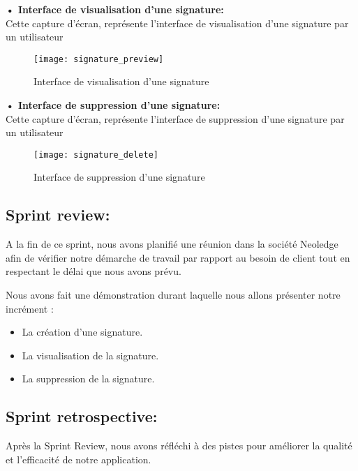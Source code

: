 \textbf{•	Interface de visualisation d'une signature:}\\
Cette capture d'écran, représente l'interface de visualisation d'une signature par un utilisateur

\newpage

\begin{figure}[h]
  \centering
  \texttt{[image: signature\_preview]}
  \caption{Interface de visualisation d'une signature}
  \label{fig:signature_view}
\end{figure}

\textbf{•	Interface de suppression d'une signature:}\\
Cette capture d'écran, représente l'interface de suppression d'une signature par un utilisateur

\begin{figure}[h!]
  \centering
  \texttt{[image: signature\_delete]}
  \caption{Interface de suppression d'une signature}
  \label{fig:signature_delete}
\end{figure}



\subsection{Sprint review:}
A la fin de ce sprint, nous avons planifié une réunion dans la société Neoledge afin de vérifier notre démarche de travail par rapport au besoin de client tout en respectant le délai que nous avons prévu.

Nous avons fait une démonstration durant laquelle nous allons présenter notre incrément :

\begin{itemize}
  \item La création d'une signature.
  \item La visualisation de la signature.
  \item La suppression de la signature.
\end{itemize}

\subsection{Sprint retrospective:}

Après la Sprint Review, nous avons réfléchi à des pistes pour améliorer la qualité et l'efficacité de notre application.

